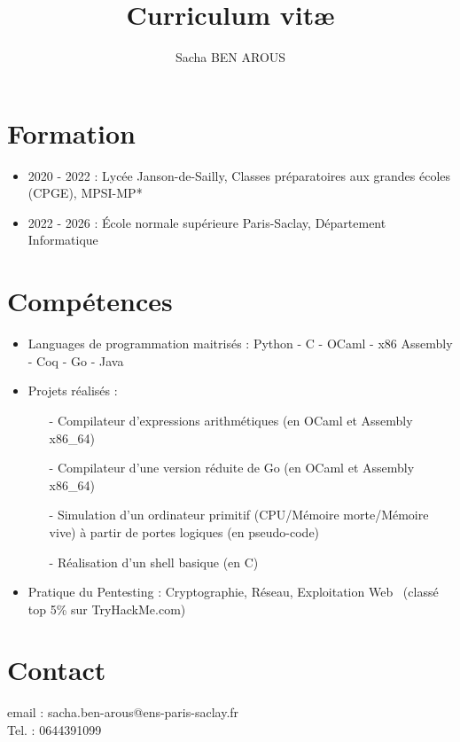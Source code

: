 \documentclass[11pt,a4paper]{article}
\begin{document}
\title{Curriculum vitæ}
\date{}
\author{Sacha BEN AROUS}
\maketitle 

\section{Formation}

\begin{itemize}
\item 2020 - 2022 : Lycée Janson-de-Sailly, Classes préparatoires aux grandes écoles (CPGE), MPSI-MP*
\item 2022 - 2026 : École normale supérieure Paris-Saclay, Département Informatique
\end{itemize}

\section{Compétences}
\begin{itemize}
\item Languages de programmation maitrisés : Python - C - OCaml - x86 Assembly - Coq - Go - Java 
\item Projets réalisés : \begin{itemize}
\item[-] Compilateur d'expressions arithmétiques (en OCaml et Assembly x86\_64)
\item[-] Compilateur d'une version réduite de Go (en OCaml et Assembly x86\_64)
\item[-] Simulation d'un ordinateur primitif (CPU/Mémoire morte/Mémoire vive) à partir de portes logiques (en pseudo-code)
\item[-] Réalisation d'un shell basique (en C)
\end{itemize}
\item Pratique du Pentesting : Cryptographie, Réseau, Exploitation Web \ (classé top 5\% sur TryHackMe.com)
\end{itemize}

\section{Contact}

email : sacha.ben-arous@ens-paris-saclay.fr \\
Tel. : 0644391099
\end{document}
